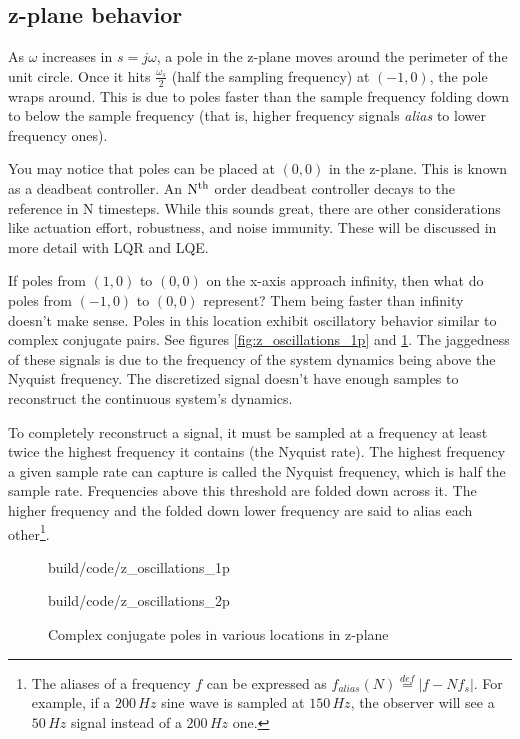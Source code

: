 \subsection{z-plane behavior}

As $\omega$ increases in $s = j\omega$, a pole in the z-plane moves around the
perimeter of the unit circle. Once it hits $\frac{\omega_s}{2}$ (half the
sampling frequency) at $(-1, 0)$, the pole wraps around. This is due to poles
faster than the sample frequency folding down to below the sample frequency
(that is, higher frequency signals \textit{alias} to lower frequency ones).

You may notice that poles can be placed at $(0, 0)$ in the z-plane. This is
known as a deadbeat controller. An $\rm N^{th}$ order deadbeat controller decays
to the \gls{reference} in N timesteps. While this sounds great, there are other
considerations like actuation effort, \gls{robustness}, and
\gls{noise immunity}. These will be discussed in more detail with LQR and LQE.

If poles from $(1, 0)$ to $(0, 0)$ on the x-axis approach infinity, then what do
poles from $(-1, 0)$ to $(0, 0)$ represent? Them being faster than infinity
doesn't make sense. Poles in this location exhibit oscillatory behavior similar
to complex conjugate pairs. See figures \ref{fig:z_oscillations_1p} and
\ref{fig:z_oscillations_2p}. The jaggedness of these signals is due to the
frequency of the system dynamics being above the Nyquist frequency. The
discretized signal doesn't have enough samples to reconstruct the continuous
system's dynamics.

To completely reconstruct a signal, it must be sampled at a frequency at least
twice the highest frequency it contains (the Nyquist rate). The highest
frequency a given sample rate can capture is called the Nyquist frequency, which
is half the sample rate. Frequencies above this threshold are folded down across
it. The higher frequency and the folded down lower frequency are said to alias
each other\footnote{The aliases of a frequency $f$ can be expressed as
$f_{alias}(N) \stackrel{def}{=} |f - Nf_s|$. For example, if a $200\,Hz$ sine
wave is sampled at $150\,Hz$, the observer will see a $50\,Hz$ signal instead of
a $200\,Hz$ one.}.

\begin{figure}
  \begin{minisvg}{build/code/z_oscillations_1p}
    \caption{Single poles in various locations in z-plane}
    \label{fig:z_oscillations_1p}
  \end{minisvg}
  \hfill
  \begin{minisvg}{build/code/z_oscillations_2p}
    \caption{Complex conjugate poles in various locations in z-plane}
    \label{fig:z_oscillations_2p}
  \end{minisvg}
\end{figure}


